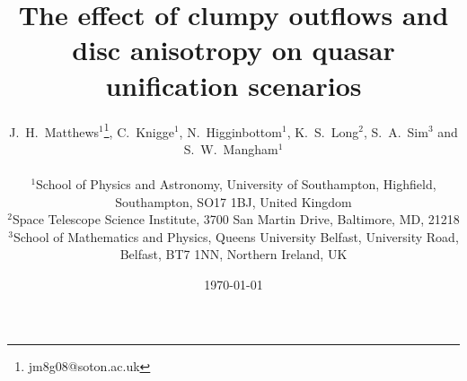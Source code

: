 \documentclass[useAMS,usenatbib]{mn2e_x}
\begin{document}


\def\py{\textsc{Python}}
\def\tar{\textsc{Tardis}}
\def\cld{\textsc{Cloudy}}
\def\agn{\textsc{Agnspec}}


\def\civ{C~\textsc{iv}}
\def\nv{N~\textsc{v}}
\def\hei{He~\textsc{i}}
\def\heii{He~\textsc{ii}}
\def\mg{Mg~\textsc{ii}}
\def\al{Al~\textsc{iii}}
\def\heii{He~\textsc{ii}}
\def\ovi{O~\textsc{vi}}
\def\la{Ly~$\alpha$}
\def\ha{H~$\alpha$}
\def\hb{H~$\beta$}



\def\araa{ARAA}
\def\nat{Nature}
\def\apjl{ApJ Letters}
\def\aapr{AAPR}
\def\ssr{SSR}
\def\apj{ApJ}
\def\apjs{ApJs}
\def\pasp{PASP}
\def\aap{A\&A}
\def\mnras{MNRAS}
\def\aj{AJ}
\def\rmxaa{RMXAA}

%
%

\title
{
The effect of clumpy outflows
and disc anisotropy on quasar unification scenarios
}



\author[Matthews et al.]{
\parbox[t]{\textwidth}{
J.~H.~Matthews$^1$\thanks{jm8g08@soton.ac.uk}, C.~Knigge$^1$,
N.~Higginbottom$^1$, K.~S.~Long$^2$, S.~A.~Sim$^3$ and S.~W.~Mangham$^1$
}
\medskip  
\\$^1$School of Physics and Astronomy, University of Southampton, Highfield, Southampton, SO17 1BJ, United Kingdom
\\$^2$Space Telescope Science Institute, 3700 San Martin Drive, Baltimore, MD, 21218
\\$^3$School of Mathematics and Physics, Queens University Belfast, University Road, Belfast, BT7 1NN, Northern Ireland, UK
}

\date{\today}


%
%
\end{document}

